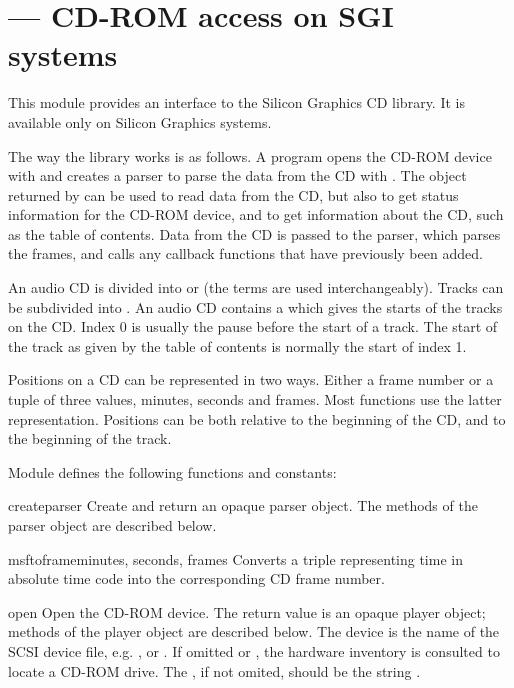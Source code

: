 \section{ ---
         CD-ROM access on SGI systems}



This module provides an interface to the Silicon Graphics CD library.
It is available only on Silicon Graphics systems.

The way the library works is as follows.  A program opens the CD-ROM
device with  and creates a parser to parse the data
from the CD with .  The object returned by
 can be used to read data from the CD, but also to get
status information for the CD-ROM device, and to get information about
the CD, such as the table of contents.  Data from the CD is passed to
the parser, which parses the frames, and calls any callback
functions that have previously been added.

An audio CD is divided into  or  (the terms
are used interchangeably).  Tracks can be subdivided into
.  An audio CD contains a  which
gives the starts of the tracks on the CD.  Index 0 is usually the
pause before the start of a track.  The start of the track as given by
the table of contents is normally the start of index 1.

Positions on a CD can be represented in two ways.  Either a frame
number or a tuple of three values, minutes, seconds and frames.  Most
functions use the latter representation.  Positions can be both
relative to the beginning of the CD, and to the beginning of the
track.

Module  defines the following functions and constants:


\begin{funcdesc}{createparser}{}
Create and return an opaque parser object.  The methods of the parser
object are described below.
\end{funcdesc}

\begin{funcdesc}{msftoframe}{minutes, seconds, frames}
Converts a  triple
representing time in absolute time code into the corresponding CD
frame number.
\end{funcdesc}

\begin{funcdesc}{open}{}
Open the CD-ROM device.  The return value is an opaque player object;
methods of the player object are described below.  The device is the
name of the SCSI device file, e.g. , or
.  If omitted or , the hardware inventory is
consulted to locate a CD-ROM drive.  The , if not omited,
should be the string .
\end{funcdesc}

